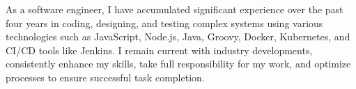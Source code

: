 

\begin{cvparagraph}

As a software engineer, I have accumulated significant experience over the past four years in coding, designing, and testing complex systems using various technologies such as JavaScript, Node.js, Java, Groovy, Docker, Kubernetes, and CI/CD tools like Jenkins. I remain current with industry developments, consistently enhance my skills, take full responsibility for my work, and optimize processes to ensure successful task completion.
\end{cvparagraph}